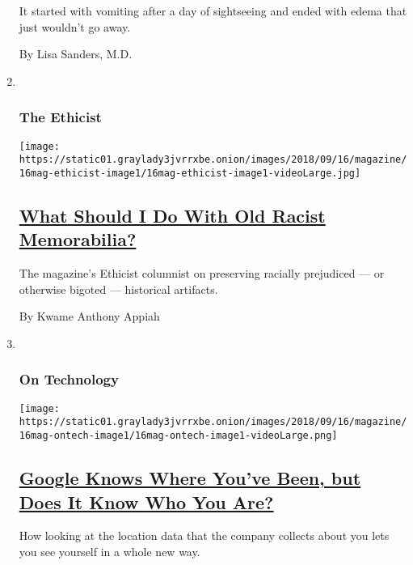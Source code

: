 \begin{enumerate}
  It started with vomiting after a day of sightseeing and ended with
  edema that just wouldn't go away.

  By Lisa Sanders, M.D.
\item ~
  \hypertarget{the-ethicist}{%
  \subsubsection{The Ethicist}\label{the-ethicist}}

  \texttt{[image: https://static01.graylady3jvrrxbe.onion/images/2018/09/16/magazine/16mag-ethicist-image1/16mag-ethicist-image1-videoLarge.jpg]}

  \hypertarget{what-should-i-do-with-old-racist-memorabilia}{%
  \subsection{\texorpdfstring{\href{/2018/09/11/magazine/what-should-i-do-with-old-racist-memorabilia.html}{What
  Should I Do With Old Racist
  Memorabilia?}}{What Should I Do With Old Racist Memorabilia?}}\label{what-should-i-do-with-old-racist-memorabilia}}

  The magazine's Ethicist columnist on preserving racially prejudiced
  --- or otherwise bigoted --- historical artifacts.

  By Kwame Anthony Appiah
\item ~
  \hypertarget{on-technology}{%
  \subsubsection{On Technology}\label{on-technology}}

  \texttt{[image: https://static01.graylady3jvrrxbe.onion/images/2018/09/16/magazine/16mag-ontech-image1/16mag-ontech-image1-videoLarge.png]}

  \hypertarget{google-knows-where-youve-been-but-does-it-know-who-you-are}{%
  \subsection{\texorpdfstring{\href{/2018/09/12/magazine/google-maps-location-data-privacy.html}{Google
  Knows Where You've Been, but Does It Know Who You
  Are?}}{Google Knows Where You've Been, but Does It Know Who You Are?}}\label{google-knows-where-youve-been-but-does-it-know-who-you-are}}

  How looking at the location data that the company collects about you
  lets you see yourself in a whole new way.


\end{enumerate}
